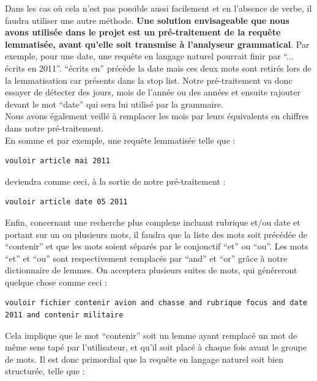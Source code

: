 \medskip

Dans les cas où cela n'est pas possible aussi facilement et en l'absence de verbe, il faudra utiliser une autre méthode. \textbf{Une solution envisageable que nous avons utilisée dans le projet est un pré-traitement de la requête lemmatisée, avant qu'elle soit transmise à l'analyseur grammatical}. Par exemple, pour une date, une requête en langage naturel pourrait finir par ``... écrits en 2011''. ``écrits en'' précède la date mais ces deux mots sont retirés lors de la lemmatisation car présents dans la stop list. Notre pré-traitement va donc essayer de détecter des jours, mois de l'année ou des années et ensuite rajouter devant le mot ``date'' qui sera lui utilisé par la grammaire.\\
Nous avons également veillé à remplacer les mois par leurs équivalents en chiffres dans notre pré-traitement.\\
En somme et par exemple, une requête lemmatisée telle que :

\begin{lstlisting}
vouloir article mai 2011
\end{lstlisting}
deviendra comme ceci, à la sortie de notre pré-traitement :
\begin{lstlisting}
vouloir article date 05 2011
\end{lstlisting}

\bigskip

Enfin, concernant une recherche plus complexe incluant rubrique et/ou date et portant sur un ou plusieurs mots, il faudra que la liste des mots soit précédée de ``contenir'' et que les mots soient séparés par le conjonctif ``et'' ou ``ou''. Les mots ``et'' et ``ou'' sont respectivement remplacés par ``and'' et ``or'' grâce à notre dictionnaire de lemmes. On acceptera plusieurs suites de mots, qui généreront quelque chose comme ceci :

\begin{lstlisting}
vouloir fichier contenir avion and chasse and rubrique focus and date 2011 and contenir militaire
\end{lstlisting}

Cela implique que le mot ``contenir'' soit un lemme ayant remplacé un mot de même sens tapé par l'utilisateur, et qu'il soit placé à chaque fois avant le groupe de mots. Il est donc primordial que la requête en langage naturel soit bien structurée, telle que :


